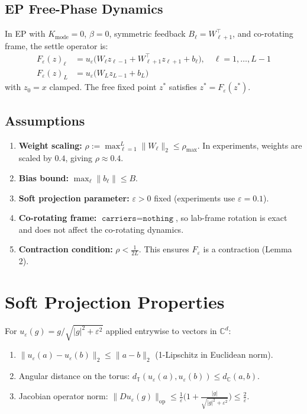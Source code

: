 \documentclass[11pt]{article}
\newcommand{\C}{\mathbb{C}}
\newcommand{\T}{\mathbb{T}}
\begin{document}
\subsection{EP Free-Phase Dynamics}
In EP with $K_\text{mode}=0$, $\beta=0$, symmetric feedback
$B_\ell = W_{\ell+1}^\top$, and co-rotating frame, the settle operator
is:
\begin{align}
  F_\varepsilon(z)_\ell &= u_\varepsilon\big(W_\ell z_{\ell-1} +
  W_{\ell+1}^\top z_{\ell+1} + b_\ell\big), \quad \ell=1,\dots,L-1 \\
  F_\varepsilon(z)_L &= u_\varepsilon\big(W_L z_{L-1} + b_L\big)
\end{align}
with $z_0 = x$ clamped. The free fixed point $z^*$ satisfies
$z^* = F_\varepsilon(z^*)$.

\subsection{Assumptions}
\begin{enumerate}
  \item[(A1)] \textbf{Weight scaling:} $\rho := \max_{\ell=1}^L \|W_\ell\|_2 \le \rho_\text{max}$.
    In experiments, weights are scaled by $0.4$, giving $\rho \approx 0.4$.
  \item[(A2)] \textbf{Bias bound:} $\max_\ell \|b_\ell\| \le B$.
  \item[(A3)] \textbf{Soft projection parameter:} $\varepsilon > 0$ fixed
    (experiments use $\varepsilon = 0.1$).
  \item[(A4)] \textbf{Co-rotating frame:} $\texttt{carriers}=\texttt{nothing}$,
    so lab-frame rotation is exact and does not affect the co-rotating
    dynamics.
  \item[(A5)] \textbf{Contraction condition:} $\rho < \frac{1}{2L}$.
    This ensures $F_\varepsilon$ is a contraction (Lemma 2).
\end{enumerate}

\section{Soft Projection Properties}

\begin{lemma}
\label{lem:soft-lipschitz}
For $u_\varepsilon(g) = g/\sqrt{|g|^2+\varepsilon^2}$ applied entrywise
to vectors in $\C^d$:
\begin{enumerate}
  \item[(i)] $\|u_\varepsilon(a) - u_\varepsilon(b)\|_2 \le \|a - b\|_2$
    (1-Lipschitz in Euclidean norm).
  \item[(ii)] Angular distance on the torus:
    $d_\T(u_\varepsilon(a), u_\varepsilon(b)) \le d_\C(a,b)$.
  \item[(iii)] Jacobian operator norm: $\|Du_\varepsilon(g)\|_\text{op}
    \le \frac{1}{\varepsilon}\big(1 + \frac{|g|}{\sqrt{|g|^2+\varepsilon^2}}
    \big) \le \frac{2}{\varepsilon}$.
\end{enumerate}
\end{lemma}
\end{document}
